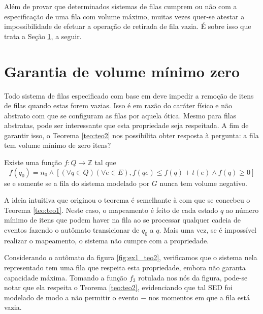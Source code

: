 Além de provar que determinados sistemas de filas cumprem ou não com a especificação de uma fila com volume máximo, muitas vezes quer-se atestar a impossibilidade de efetuar a operação de retirada de fila vazia. É sobre isso que trata a Seção \ref{sec:vol_min}, a seguir.

\section{Garantia de volume mínimo zero}
\label{sec:vol_min}

Todo sistema de filas especificado com base em  deve impedir a remoção de itens de filas quando estas forem vazias. Isso é em razão do caráter físico e não abstrato com que se configuram as filas por aquela ótica. Mesmo para filas abstratas, pode ser interessante que esta propriedade seja respeitada. A fim de garantir isso, o Teorema \ref{teo:teo2} nos possibilita obter resposta à pergunta: a fila tem volume mínimo de zero itens?

\begin{teo}
	\label{teo:teo2}
	Existe uma função $f : Q \to \mathbb{Z}$ tal que \begin{equation*}
	f(q_0) = n_0 \wedge [(\forall q \in Q)(\forall e \in E), f(qe) \leq f(q) + t(e) \wedge f(q) \geq 0]
	\end{equation*} se e somente se a fila do sistema modelado por $G$ nunca tem volume negativo.
\end{teo}

A ideia intuitiva que originou o teorema é semelhante à com que se concebeu o Teorema \ref{teo:teo1}. Neste caso, o mapeamento é feito de cada estado $q$ ao número mínimo de itens que podem haver na fila ao se processar qualquer cadeia de eventos fazendo o autômato transicionar de $q_0$ a $q$. Mais uma vez, se é impossível realizar o mapeamento, o sistema não cumpre com a propriedade.

Considerando o autômato da figura \ref{fig:ex1_teo2}, verificamos que o sistema nela representado tem uma fila que respeita esta propriedade, embora não garanta capacidade máxima. Tomando a função $f_3$ rotulada nos nós da figura, pode-se notar que ela respeita o Teorema \ref{teo:teo2}, evidenciando que tal SED foi modelado de modo a não permitir o evento $-$ nos momentos em que a fila está vazia.


